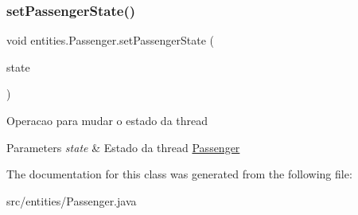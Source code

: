 \subsubsection{\texorpdfstring{set\+Passenger\+State()}{setPassengerState()}}
{\footnotesize\ttfamily void entities.\+Passenger.\+set\+Passenger\+State (\begin{DoxyParamCaption}\item[{\hyperlink{enumentities_1_1_passenger_enum}{Passenger\+Enum}}]{state }\end{DoxyParamCaption})\hspace{0.3cm}{\ttfamily [inline]}}

Operacao para mudar o estado da thread 
\begin{DoxyParams}{Parameters}
{\em state} & Estado da thread \hyperlink{classentities_1_1_passenger}{Passenger} \\
\hline
\end{DoxyParams}


The documentation for this class was generated from the following file\+:\begin{DoxyCompactItemize}
\item 
src/entities/Passenger.\+java\end{DoxyCompactItemize}
